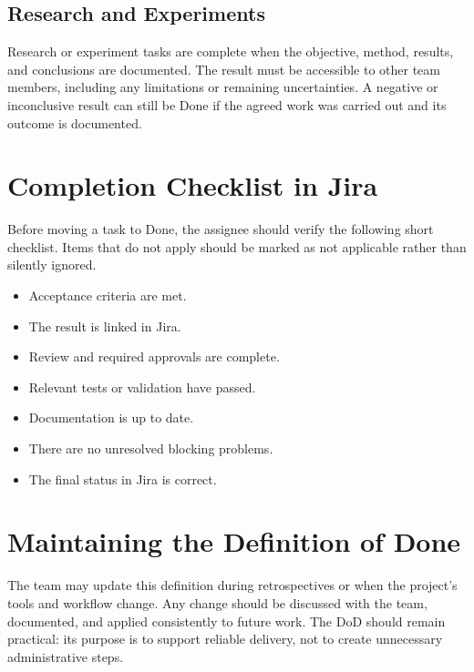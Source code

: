 \documentclass[12pt,a4paper]{article}
\newif\ifshowbibliography
\begin{document}
\subsection{Research and Experiments}

Research or experiment tasks are complete when the objective, method,
results, and conclusions are documented. The result must be accessible to
other team members, including any limitations or remaining uncertainties.
A negative or inconclusive result can still be Done if the agreed work was
carried out and its outcome is documented.


\section{Completion Checklist in Jira}

Before moving a task to Done, the assignee should verify the following
short checklist. Items that do not apply should be marked as not applicable
rather than silently ignored.

\begin{itemize}
    \item[$\square$] Acceptance criteria are met.
    \item[$\square$] The result is linked in Jira.
    \item[$\square$] Review and required approvals are complete.
    \item[$\square$] Relevant tests or validation have passed.
    \item[$\square$] Documentation is up to date.
    \item[$\square$] There are no unresolved blocking problems.
    \item[$\square$] The final status in Jira is correct.
\end{itemize}

\section{Maintaining the Definition of Done}

The team may update this definition during retrospectives or when the
project's tools and workflow change. Any change should be discussed with
the team, documented, and applied consistently to future work. The DoD
should remain practical: its purpose is to support reliable delivery, not
to create unnecessary administrative steps.

\ifshowbibliography
    \clearpage
    \printbibliography[heading=bibintoc,title={References}]
\fi
\end{document}
